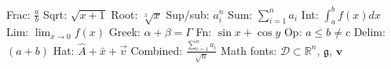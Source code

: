 
Frac: $\frac{a}{b}$
Sqrt: $\sqrt{x+1}$
Root: $\sqrt[3]{x}$
Sup/sub: $a_i^n$
Sum: $\sum_{i=1}^{n} a_i$
Int: $\int_a^b f(x) dx$
Lim: $\lim_{x \to 0} f(x)$
Greek: $\alpha + \beta = \Gamma$
Fn: $\sin x + \cos y$
Op: $a \le b \ne c$
Delim: $\left( a + b \right)$
Hat: $\hat{A} + \bar{x} + \vec{v}$
Combined: $\frac{\sum_{i=1}^{n} a_i}{\sqrt{n}}$
Math fonts: $\mathcal{D} \subset \mathbb{R}^n$, $\mathfrak{g}$, $\mathbf{v}$
